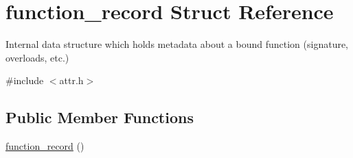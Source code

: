 \hypertarget{structfunction__record}{}\section{function\+\_\+record Struct Reference}
\label{structfunction__record}


Internal data structure which holds metadata about a bound function (signature, overloads, etc.)  




{\ttfamily \#include $<$attr.\+h$>$}

\subsection*{Public Member Functions}
\begin{DoxyCompactItemize}
\item 
\mbox{\hyperlink{structfunction__record_a29becdf2041f6b80b1f1531d22175ed9}{function\+\_\+record}} ()
\end{DoxyCompactItemize}
